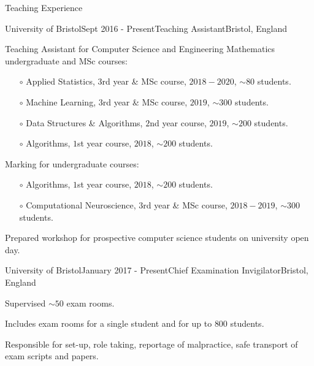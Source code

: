 \documentclass{resume} %
\begin{document}
\begin{rSection}{Teaching Experience}
  \begin{rSubsection}{University of Bristol}{Sept 2016 - Present}{Teaching Assistant}{Bristol, England}
    \item Teaching Assistant for Computer Science and Engineering Mathematics undergraduate and MSc courses:
      \begin{itemize}
        \item[$\circ$] Applied Statistics, $3$rd year \&  MSc course, $2018 - 2020$, $\sim 80$ students. 
        \item[$\circ$] Machine Learning, $3$rd year \& MSc course, $2019$, $\sim 300$ students.
        \item[$\circ$] Data Structures \& Algorithms, $2$nd year course, $2019$, $\sim 200$ students.
        \item[$\circ$] Algorithms, $1$st year course, $2018$, $\sim 200$ students.
      \end{itemize}\vspace{1.5mm}
    \item Marking for undergraduate courses: 
      \begin{itemize}
        \item[$\circ$] Algorithms, $1$st year course, $2018$, $\sim 200$ students.
        \item[$\circ$] Computational Neuroscience, $3$rd year \& MSc course, $2018-2019$, $\sim 300$ students.
      \end{itemize}\vspace{1.5mm}
    \item Prepared workshop for prospective computer science students on university open day.
  \end{rSubsection}

  \begin{rSubsection}{University of Bristol}{January 2017 - Present}{Chief Examination Invigilator}{Bristol, England}
    \item Supervised $\sim 50$ exam rooms.
    \item Includes exam rooms for a single student and for up to $800$ students.
    \item Responsible for set-up, role taking, reportage of malpractice, safe transport of exam scripts and papers.
  \end{rSubsection}
\end{rSection}

\end{document}
